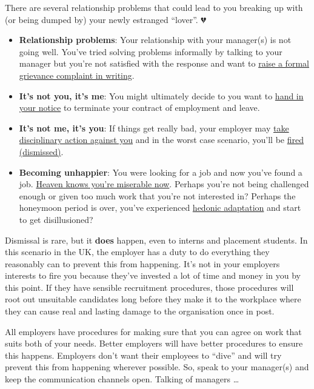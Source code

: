 \documentclass[
]{book}
\providecommand{\tightlist}{%
  \setlength{\itemsep}{0pt}\setlength{\parskip}{0pt}}
\begin{document}
There are several relationship problems that could lead to you breaking up with (or being dumped by) your newly estranged ``lover''. 💔

\begin{itemize}
\tightlist
\item
  \textbf{Relationship problems}: Your relationship with your manager(s) is not going well. You've tried solving problems informally by talking to your manager but you're not satisfied with the response and want to \href{https://www.gov.uk/raise-grievance-at-work}{raise a formal grievance complaint in writing}. \citep{grievance}
\item
  \textbf{It's not you, it's me}: You might ultimately decide to you want to \href{https://www.gov.uk/handing-in-your-notice}{hand in your notice} to terminate your contract of employment and leave. \citep{iquit}
\item
  \textbf{It's not me, it's you}: If things get really bad, your employer may \href{https://www.gov.uk/disciplinary-procedures-and-action-at-work}{take disciplinary action against you} \citep{dive} and in the worst case scenario, you'll be \href{https://www.gov.uk/dismissal}{fired (dismissed)}. \citep{yourefired}
\item
  \textbf{Becoming unhappier}: You were looking for a job and now you've found a job. \href{https://en.wikipedia.org/wiki/Heaven_Knows_I\%27m_Miserable_Now}{Heaven knows you're miserable now}. \citep{miserablenow} Perhaps you're not being challenged enough or given too much work that you're not interested in? Perhaps the honeymoon period is over, you've experienced \href{https://en.wikipedia.org/wiki/Hedonic_treadmill}{hedonic adaptation} and start to get disillusioned? \citep{lauriesantos}
\end{itemize}

Dismissal is rare, but it \textbf{does} happen, even to interns and placement students. In this scenario in the UK, the employer has a duty to do everything they reasonably can to prevent this from happening. It's not in your employers interests to fire you because they've invested a lot of time and money in you by this point. If they have sensible recruitment procedures, those procedures will root out unsuitable candidates long before they make it to the workplace where they can cause real and lasting damage to the organisation once in post.

All employers have procedures for making sure that you can agree on work that suits both of your needs. Better employers will have better procedures to ensure this happens. Employers don't want their employees to ``dive'' and will try prevent this from happening wherever possible. So, speak to your manager(s) and keep the communication channels open. Talking of managers \ldots{}
\end{document}
